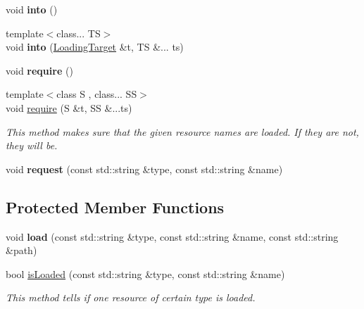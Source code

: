 \begin{DoxyCompactItemize}
void {\bfseries into} ()
\item 
\mbox{\label{classzt_1_1_resource_provider_aa23d6aefb7e5f147b37cf08e3c617b5b}} 
{\footnotesize template$<$class... TS$>$ }\\void {\bfseries into} (\hyperlink{classzt_1_1_loading_target}{Loading\+Target} \&t, TS \&... ts)
\item 
\mbox{\label{classzt_1_1_resource_provider_ac54b02898020c6de5d55698d02383b85}} 
void {\bfseries require} ()
\item 
{\footnotesize template$<$class S , class... SS$>$ }\\void \hyperlink{classzt_1_1_resource_provider_af7a24c529d5255270e032198c985e603}{require} (S \&t, SS \&...ts)
\begin{DoxyCompactList}\small\item\em This method makes sure that the given resource names are loaded. If they are not, they will be. \end{DoxyCompactList}\item 
\mbox{\label{classzt_1_1_resource_provider_aa52dfc3f3022366aa279b78ca36b673e}} 
void {\bfseries request} (const std\+::string \&type, const std\+::string \&name)
\end{DoxyCompactItemize}
\subsection*{Protected Member Functions}
\begin{DoxyCompactItemize}
\item 
\mbox{\label{classzt_1_1_resource_provider_a77afe93ee461dffaa8c1f83b0641d3be}} 
void {\bfseries load} (const std\+::string \&type, const std\+::string \&name, const std\+::string \&path)
\item 
bool \hyperlink{classzt_1_1_resource_provider_a40819044cb7a63200d99f73a66887be1}{is\+Loaded} (const std\+::string \&type, const std\+::string \&name)
\begin{DoxyCompactList}\small\item\em This method tells if one resource of certain type is loaded. \end{DoxyCompactList}\end{DoxyCompactItemize}


